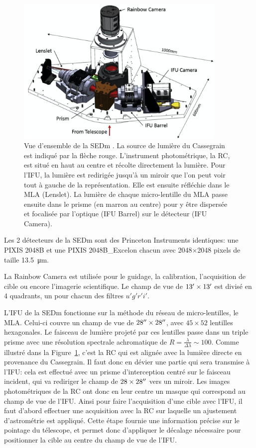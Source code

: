 \documentclass[../main/main.tex]{subfiles}
\begin{document}
\begin{figure}[h]
  \centering
  \includegraphics[width=0.9\textwidth]{../figures/03_sedm/sedmoverview.png}
  \caption[Vue d'ensemble de la SEDm]{Vue d'ensemble de la SEDm
    \citep{SEDM18}. La source de lumière du Cassegrain est indiqué par
    la flèche rouge. L'instrument photométrique, la RC, est situé en
    haut au centre et récolte directement la lumière. Pour l'IFU, la
    lumière est redirigée jusqu'à un miroir que l'on peut voir tout à
    gauche de la représentation. Elle est ensuite réfléchie dans le MLA
    (Lenslet). La lumière de chaque micro-lentille du MLA passe ensuite
    dans le prisme (en marron au centre) pour y être dispersée et
    focalisée par l'optique (IFU Barrel) sur le détecteur (IFU Camera).}
  \label{fig:sedmoverview}
\end{figure}

Les 2 détecteurs de la SEDm sont des Princeton Instruments identiques:
une PIXIS 2048B et une PIXIS 2048B\_Excelon chacun avec 2048$\times$2048
pixels de taille \SI{13.5}{\micro\metre}.

La Rainbow Camera est utilisée pour le guidage, la calibration,
l'acquisition de cible ou encore l'imagerie scientifique. Le champ de
vue de $13^\prime\times13^\prime$ est divisé en 4 quadrants, un pour
chacun des filtres $u'g'r'i'$.

L'IFU de la SEDm fonctionne sur la méthode du réseau de micro-lentilles,
le MLA. Celui-ci couvre un champ de vue de $28^{\prime\prime}\times28^{\prime\prime}$, avec
$45\times52$ lentilles hexagonales. Le faisceau de lumière projeté par
ces lentilles passe dans un triple prisme avec une résolution spectrale
achromatique de $R=\frac{\lambda}{\Delta\lambda}\sim100$.
Comme illustré dans la Figure~\ref{fig:sedmoverview}, c'est la RC qui
est alignée avec la lumière directe en provenance du Cassegrain. Il faut donc en dévier une
partie qui sera transmise à l'IFU: cela est effectué avec un
prisme d'interception centré sur le faisceau incident, qui va rediriger
le champ de $28\times28^{\prime\prime}$ vers un miroir. Les images
photométriques de la RC ont donc en leur centre un masque qui correspond
au champ de vue de l'IFU. Ainsi pour faire l'acquisition d'une cible
avec l'IFU, il faut d'abord effectuer une acquisition avec la RC sur
laquelle un ajustement d'astrométrie est appliqué. Cette étape fournie une
information précise sur le pointage du télescope, et permet donc
d'appliquer le décalage nécessaire pour positionner la cible au centre du
champ de vue de l'IFU.
\end{document}
